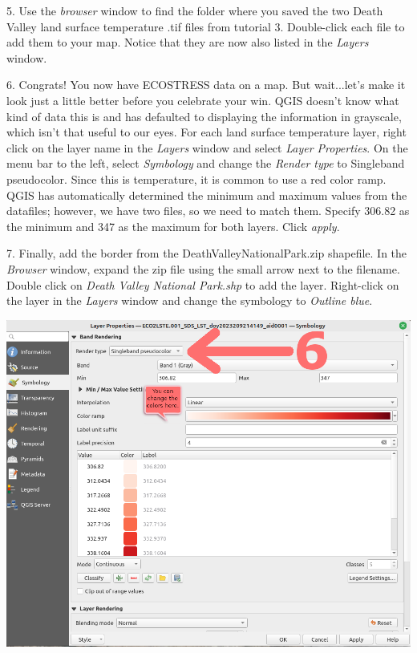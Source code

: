 \documentclass[oneside,a4paper,11pt,explicit]{book}
\begin{document}
\vspace{1em}

5. Use the \textit{browser} window to find the folder where you saved the two Death Valley land surface temperature .tif files from tutorial 3. Double-click each file to add them to your map. Notice that they are now also listed in the \textit{Layers} window.

6. Congrats! You now have ECOSTRESS data on a map. But wait...let's make it look just a little better before you celebrate your win. QGIS doesn't know what kind of data this is and has defaulted to displaying the information in grayscale, which isn't that useful to our eyes. For each land surface temperature layer, right click on the layer name in the \textit{Layers} window and select \textit{Layer Properties}. On the menu bar to the left, select \textit{Symbology} and change the \textit{Render type} to Singleband pseudocolor. Since this is temperature, it is common to use a red color ramp. QGIS has automatically determined the minimum and maximum values from the datafiles; however, we have two files, so we need to match them. Specify 306.82 as the minimum and 347 as the maximum for both layers. Click \textit{apply}.

7. Finally, add the border from the DeathValleyNationalPark.zip shapefile. In the \textit{Browser} window, expand the zip file using the small arrow next to the filename. Double click on \textit{Death Valley National Park.shp} to add the layer. Right-click on the layer in the \textit{Layers} window and change the symbology to \textit{Outline
blue}. 




\vspace{1em}

\centerline{\includegraphics[width=.75\textwidth]{SymbologyLST.png}}
\end{document}
